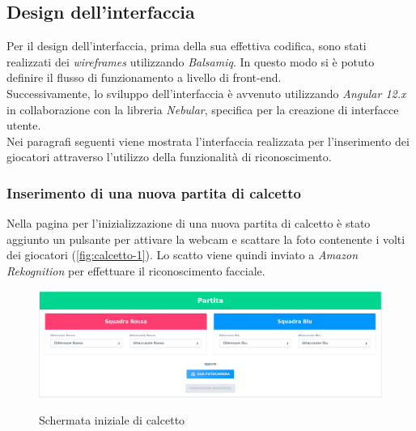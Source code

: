 		
		
	
	
	\subsection{Design dell'interfaccia}
	Per il design dell'interfaccia, prima della sua effettiva codifica, sono stati realizzati dei \emph{wireframes} utilizzando \emph{Balsamiq}. In questo modo si è potuto definire il flusso di funzionamento a livello di front-end. \\ 

	\noindent Successivamente, lo sviluppo dell'interfaccia è avvenuto utilizzando \emph{Angular 12.x} in collaborazione con la libreria 
	\emph{Nebular}, specifica per la creazione di interfacce utente. \\
	
	\noindent Nei paragrafi seguenti viene mostrata l'interfaccia realizzata per l'inserimento dei giocatori attraverso l'utilizzo della funzionalità di riconoscimento.
	
		\subsubsection{Inserimento di una nuova partita di calcetto}
		Nella pagina per l'inizializzazione di una nuova partita di calcetto è stato aggiunto un pulsante per attivare la webcam e scattare la foto  contenente i volti dei giocatori (\autoref{fig:calcetto-1}). Lo scatto viene quindi inviato a \emph{Amazon Rekognition} per effettuare il riconoscimento facciale. 
		
		\begin{figure}[H]
			\centering
			\includegraphics[width=\textwidth]{immagini/calcetto-1.png} \\
			\caption{\label{fig:calcetto-1} Schermata iniziale di calcetto}
		\end{figure}
	
